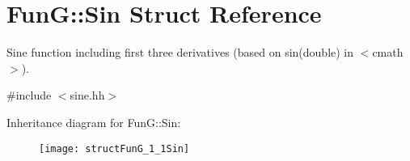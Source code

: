 \hypertarget{structFunG_1_1Sin}{\section{Fun\-G\-:\-:Sin Struct Reference}
\label{structFunG_1_1Sin}
}


Sine function including first three derivatives (based on sin(double) in $<$cmath$>$).  




{\ttfamily \#include $<$sine.\-hh$>$}

Inheritance diagram for Fun\-G\-:\-:Sin\-:\begin{figure}[H]
\begin{center}
\leavevmode
\texttt{[image: structFunG\_1\_1Sin]}
\end{center}
\end{figure}
